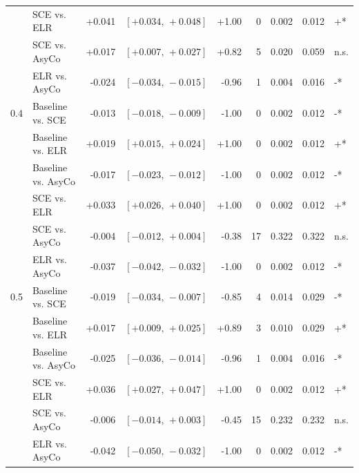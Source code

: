 \begin{small}
\begin{longtable}{llrrrrrrl}
 & SCE vs. ELR & +0.041 & $[+0.034,\,+0.048]$ & +1.00 & 0 & 0.002 & 0.012 & +* \\
 & SCE vs. AsyCo & +0.017 & $[+0.007,\,+0.027]$ & +0.82 & 5 & 0.020 & 0.059 & n.s. \\
 & ELR vs. AsyCo & -0.024 & $[-0.034,\,-0.015]$ & -0.96 & 1 & 0.004 & 0.016 & -* \\
0.4 & Baseline vs. SCE & -0.013 & $[-0.018,\,-0.009]$ & -1.00 & 0 & 0.002 & 0.012 & -* \\
 & Baseline vs. ELR & +0.019 & $[+0.015,\,+0.024]$ & +1.00 & 0 & 0.002 & 0.012 & +* \\
 & Baseline vs. AsyCo & -0.017 & $[-0.023,\,-0.012]$ & -1.00 & 0 & 0.002 & 0.012 & -* \\
 & SCE vs. ELR & +0.033 & $[+0.026,\,+0.040]$ & +1.00 & 0 & 0.002 & 0.012 & +* \\
 & SCE vs. AsyCo & -0.004 & $[-0.012,\,+0.004]$ & -0.38 & 17 & 0.322 & 0.322 & n.s. \\
 & ELR vs. AsyCo & -0.037 & $[-0.042,\,-0.032]$ & -1.00 & 0 & 0.002 & 0.012 & -* \\
0.5 & Baseline vs. SCE & -0.019 & $[-0.034,\,-0.007]$ & -0.85 & 4 & 0.014 & 0.029 & -* \\
 & Baseline vs. ELR & +0.017 & $[+0.009,\,+0.025]$ & +0.89 & 3 & 0.010 & 0.029 & +* \\
 & Baseline vs. AsyCo & -0.025 & $[-0.036,\,-0.014]$ & -0.96 & 1 & 0.004 & 0.016 & -* \\
 & SCE vs. ELR & +0.036 & $[+0.027,\,+0.047]$ & +1.00 & 0 & 0.002 & 0.012 & +* \\
 & SCE vs. AsyCo & -0.006 & $[-0.014,\,+0.003]$ & -0.45 & 15 & 0.232 & 0.232 & n.s. \\
 & ELR vs. AsyCo & -0.042 & $[-0.050,\,-0.032]$ & -1.00 & 0 & 0.002 & 0.012 & -* \\
\end{longtable}
\end{small}
